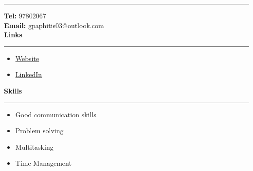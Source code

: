 \documentclass[12pt]{article}
\begin{document}
\begin{paracol}{2}
\begin{tcolorbox}[colback=bgcolor, colframe=bgcolor, boxrule=0cm, arc=0cm, outer arc=0cm, left=0.35cm, right=0.10cm, top=1cm, bottom=1.5cm,height=\textheight]
      \hrule
      \vspace{0.2cm}
      {\fontsize{10pt}{18pt}\selectfont
         \textbf{Tel:} 97802067\\
         \textbf{Email:} gpaphitis03@outlook.com\\
      }
      \vspace{0.5cm}
      {\fontsize{12pt}{18pt}\selectfont
         \textbf{{\large Links}}\\
         }
      \vspace{0.15cm}
      \hrule
      \vspace{0.2cm}
      {\fontsize{10pt}{13pt}\selectfont
      {\hypersetup{linkcolor=white, urlcolor=white, citecolor=white}
         \begin{itemize}[leftmargin=15pt, itemsep=0pt, topsep=0pt]
            \item\underline{\href{https://giorgospaphitis.com}{Website}}\\
            \item\underline{\href{https://www.linkedin.com/in/giorgos-paphitis-7307a825b/}{LinkedIn}}\\
         \end{itemize}
      }
      }
      \vspace{0.5cm}
      {\fontsize{12pt}{18pt}\selectfont
         \textbf{{\large Skills}}\\
         }
      \vspace{0.15cm}
      \hrule
      \vspace{0.2cm}
      {\fontsize{10pt}{13pt}\selectfont
      \begin{itemize}[leftmargin=15pt, itemsep=0pt, topsep=0pt]
         \item Good communication skills\\
         \item Problem solving\\
         \item Multitasking\\
         \item Time Management\\
\end{itemize}}
\end{tcolorbox}
\end{paracol}
\end{document}
